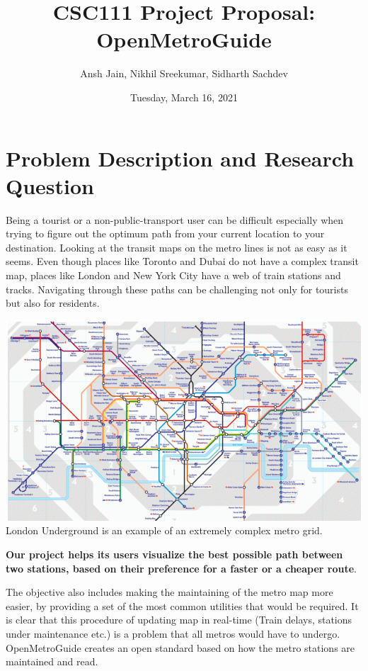 \documentclass[fontsize=11pt]{article}
\title{CSC111 Project Proposal: OpenMetroGuide}
\author{Ansh Jain, Nikhil Sreekumar, Sidharth Sachdev}
\date{Tuesday, March 16, 2021}
\begin{document}
\maketitle

\section*{Problem Description and Research Question}

Being a tourist or a non-public-transport user can be difficult especially when trying to figure out the optimum path from your current location to your destination. Looking at the transit maps on the metro lines is not as easy as it seems. Even though places like Toronto and Dubai do not have a complex transit map, places like London and New York City have a web of train stations and tracks. Navigating through these paths can be challenging not only for tourists but also for residents.\newline


\begin{center}
	\includegraphics[width = 14cm]{London Transit Map.png}\newline
	London Underground is an example of an extremely complex metro grid.
\end{center}

\textbf{Our project helps its users visualize the best possible path between two stations, based on their preference for a faster or a cheaper route}.\newline 

The objective also includes making the maintaining of the metro map more easier, by providing a set of the most common utilities that would be required. It is clear that this procedure of updating map in real-time (Train delays, stations under maintenance etc.) is a problem that all metros would have to undergo. OpenMetroGuide creates an open standard  based on how the metro stations are maintained and read.\newline
\end{document}
